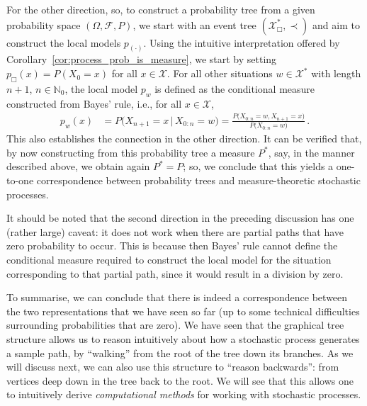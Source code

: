 \documentclass[graybox]{svmult}
\newcommand{\nats}{\mathbb{N}}
\newcommand{\natswith}{\nats_{0}}
\newcommand{\states}{\mathcal{X}}
\begin{document}
For the other direction, so, to construct a probability tree from a given probability space $(\Omega,\mathcal{F},P)$, we start with an event tree $(\states^*_\Box,\prec)$ and aim to construct the local models $p_{(\cdot)}$. Using the intuitive interpretation offered by Corollary~\ref{cor:process_prob_is_measure}, we start by setting $p_\Box(x)=P(X_0=x)$ for all $x\in\states$. For all other situations $w\in\states^*$ with length $n+1$, $n\in\natswith$, the local model $p_w$ is defined as the conditional measure constructed from Bayes' rule, i.e., for all $x\in\states$,
\begin{align}\label{eq:local_prob_tree_from_measure}
p_w(x) &= P\bigl( X_{n+1}=x\,\big\vert\, X_{0:n}=w \bigr) = \frac{P\bigl(X_{0:n}=w, X_{n+1}=x\bigr)}{P\bigl( X_{0:n}=w \bigr)}\,.
\end{align}
This also establishes the connection in the other direction. It can be verified that, by now constructing from this probability tree a measure $P^*$, say, in the manner described above, we obtain again $P^*=P$; so, we conclude that this yields a one-to-one correspondence between probability trees and measure-theoretic stochastic processes.

It should be noted that the second direction in the preceding discussion has one (rather large) caveat: it does not work when there are partial paths that have zero probability to occur. This is because then Bayes' rule cannot define the conditional measure required to construct the local model for the situation corresponding to that partial path, since it would result in a division by zero.

To summarise, we can conclude that there is indeed a correspondence between the two representations that we have seen so far (up to some technical difficulties surrounding probabilities that are zero). We have seen that the graphical tree structure allows us to reason intuitively about how a stochastic process generates a sample path, by ``walking'' from the root of the tree down its branches. As we will discuss next, we can also use this structure to ``reason backwards'': from vertices deep down in the tree back to the root. We will see that this allows one to intuitively derive \emph{computational methods} for working with stochastic processes. 
\end{document}
